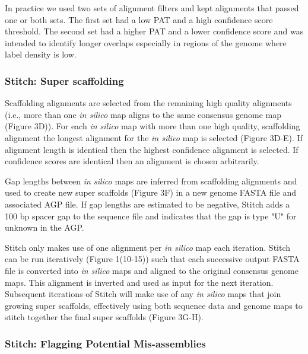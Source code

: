 \documentclass{bmcart}
\begin{document}
In practice we used two sets of alignment filters and kept alignments that passed one or both sets. The first set had a low PAT and a high confidence score threshold. The second set had a higher PAT and a lower confidence score and was intended to identify longer overlaps especially in regions of the genome where label density is low.

\subsubsection*{Stitch: Super scaffolding}


Scaffolding alignments are selected from the remaining high quality alignments (i.e., more than one \textit{in silico} map aligns to the same consensus genome map (Figure 3D)). For each \textit{in silico} map with more than one high quality, scaffolding alignment the longest alignment for the \textit{in silico} map is selected (Figure 3D-E). If alignment length is identical then the highest confidence alignment is selected. If confidence scores are identical then an alignment is chosen arbitrarily.


Gap lengths between \textit{in silico} maps are inferred from scaffolding alignments and used to create new super scaffolds (Figure 3F) in a new genome FASTA file and associated AGP file. If gap lengths are estimated to be negative, Stitch adds a 100 bp spacer gap to the sequence file and indicates that the gap is type "U" for unknown in the AGP. 


Stitch only makes use of one alignment per \textit{in silico} map each iteration. Stitch can be run iteratively (Figure 1(10-15)) such that each successive output FASTA file is converted into \textit{in silico} maps and aligned to the original consensus genome maps. This alignment is inverted and used as input for the next iteration. Subsequent iterations of Stitch will make use of any \textit{in silico} maps that join growing super scaffolds, effectively using both sequence data and genome maps to stitch together the final super scaffolds (Figure 3G-H). 

\subsubsection*{Stitch: Flagging Potential Mis-assemblies}
\end{document}
